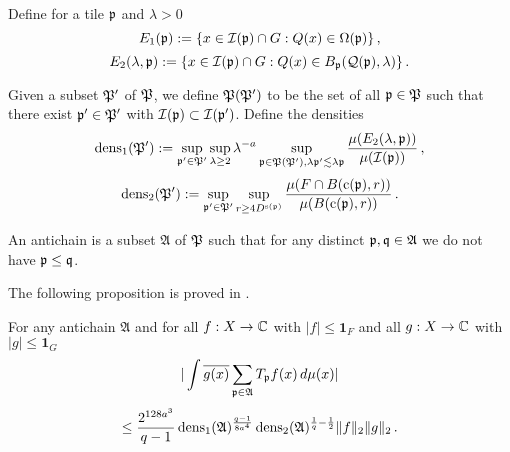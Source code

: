 Define for a tile ${\mathfrak p}$ and $\lambda>0$
\begin{equation}\label{definee1}
    E_1({\mathfrak p}):=\{x\in {\mathcal{I}}({\mathfrak p})\cap G: {Q}(x)\in {\Omega}({\mathfrak p})\}\, ,
\end{equation}
\begin{equation}\label{definee2}
    E_2(\lambda, {\mathfrak p}):=\{x\in {\mathcal{I}}({\mathfrak p})\cap G: {Q}(x)\in B_{{\mathfrak p}}({\mathcal{Q}}({\mathfrak p}), \lambda)\}\, .
\end{equation}



Given a subset ${\mathfrak P}'$ of ${\mathfrak P}$, we define
${\mathfrak P}({\mathfrak P}')$ to be the set of
all ${\mathfrak p} \in {\mathfrak P}$ such that there exist ${\mathfrak p}' \in {\mathfrak P}'$ with ${\mathcal{I}}({\mathfrak p})\subset {\mathcal{I}}({\mathfrak p}')$. Define the densities
\begin{equation}\label{definedens1}
    {\operatorname{\operatorname{dens}}}_1({\mathfrak P}') := \sup_{{\mathfrak p}'\in {\mathfrak P}'}\sup_{\lambda \geq 2} \lambda^{-a} \sup_{{\mathfrak p} \in {\mathfrak P}({\mathfrak P}'), \lambda {\mathfrak p}' \lesssim \lambda {\mathfrak p}}
    \frac{\mu({E}_2(\lambda, {\mathfrak p}))}{\mu({\mathcal{I}}({\mathfrak p}))}\, ,
\end{equation}
\begin{equation}\label{definedens2}
    {\operatorname{\operatorname{dens}}}_2({\mathfrak P}') := \sup_{{\mathfrak p}'\in {\mathfrak P}'}
    \sup_{r\ge 4D^{{\mathrm{s}}({\mathfrak p})}}
    \frac{\mu(F\cap B({\mathrm{c}}({\mathfrak p}),r))}{\mu(B({\mathrm{c}}({\mathfrak p}),r))}\, .
\end{equation}





An antichain is a subset $\mathfrak{A}$
of ${\mathfrak P}$ such that for any distinct ${\mathfrak p},{\mathfrak q}\in \mathfrak{A}$ we do not have ${\mathfrak p}\le {\mathfrak q}$.

The following proposition is proved in .

\begin{proposition}
\label{antichain-operator}
\leanok
{}

For any antichain $\mathfrak{A} $ and for all $f:X\to \mathbb{C}$ with $|f|\le \mathbf{1}_F$ and all $g:X\to\mathbb{C}$ with $|g| \le \mathbf{1}_G$
\begin{equation} \label{eq-antiprop}
    |\int \overline{g(x)} \sum_{{\mathfrak p} \in \mathfrak{A}} T_{{\mathfrak p}} f(x)\, d\mu(x)|
\end{equation}
\begin{equation}
    \le \frac{2^{128a^3}}{q-1} \operatorname{\operatorname{dens}}_1(\mathfrak{A})^{\frac {q-1}{8a^4}}\operatorname{\operatorname{dens}}_2(\mathfrak{A})^{\frac 1{q}-\frac 12} \|f\|_2 \|g\|_2\, .
\end{equation}
\end{proposition}


